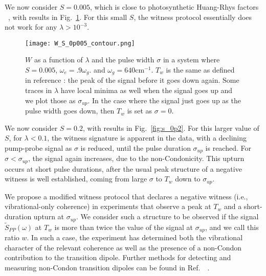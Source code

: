 We now consider $S=0.005$, which is close to photosynthetic Huang-Rhys factors ~\cite{typicalHRFforPhotosynthesis}, with results in Fig.\ \ref{fig:s_0p005}.  For this small $S$, the witness protocol essentially does not work for any $\lambda>10^{-3}$.


\begin{figure}
   \texttt{[image: W\_S\_0p005\_contour.png]}
   \caption{$W$ as a function of $\lambda$ and the pulse width $\sigma$ in a system where $S=0.005$, $\omega_e = .9 \omega_g$. and $\omega_g = 640 \text{cm}^{-1}$. $T_w$ is the same as defined in reference \cite{allanWitness}: the peak of the signal before it goes down again.   Some traces in $\lambda$ have local minima as well when the signal goes up and we plot those as $\sigma_{up}$.  In the case where the signal just goes up as the pulse width goes down, then $T_w$ is set as $\sigma=0$.  }
	\label{fig:s_0p005}
\end{figure}

We now consider $S=0.2$, with results in Fig.\ \ref{fig:s_0p2}. For this larger value of $S$, for $\lambda<0.1$, the witness signature is apparent in the data, with a declining pump-probe signal as $\sigma$ is reduced, until the pulse duration $\sigma_{up}$ is reached. For $\sigma<\sigma_{up}$, the signal again increases, due to the non-Condonicity. This upturn occurs at short pulse durations, after the usual peak structure of a negative witness is well established, coming from large $\sigma$ to $T_w$ down to $\sigma_{up}$.

We propose a modified witness protocol that declares a negative witness (i.e., vibrational-only coherence) in experiments that observe a peak at $T_w$ and a short-duration upturn at $\sigma_{up}$. We consider such a structure to be observed if the signal $\tilde{S}_{PP}(\omega)$ at $T_w$ is more than twice the value of the signal at $\sigma_{up}$, and we call this ratio $w$. In such a case, the experiment has determined both the vibrational character of the relevant coherence as well as the presence of a non-Condon contribution to the transition dipole. Further methods for detecting and measuring non-Condon transition dipoles can be found in Ref.\  ~\cite{myDetectingNonCondonPaper}.

